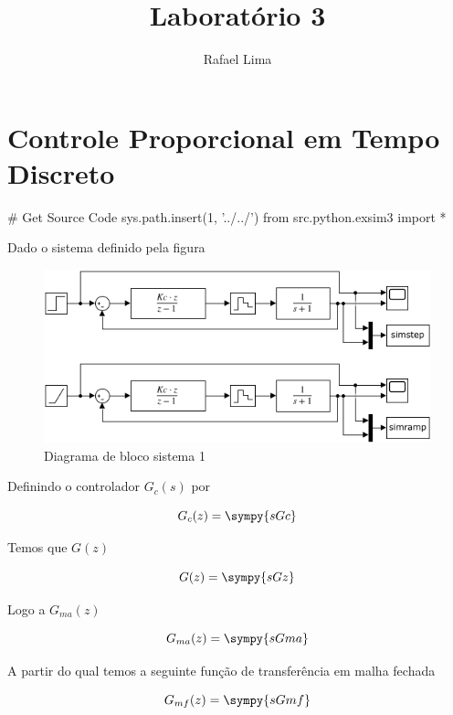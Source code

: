 \documentclass[a4paper,11pt]{article}
\title{Laboratório 3} %
\author{Rafael Lima}
\begin{document}

\section{Controle Proporcional em Tempo Discreto}

\begin{sympycode}
# Get Source Code
sys.path.insert(1, '../../')
from src.python.exsim3 import *
\end{sympycode}

Dado o sistema definido pela figura

\begin{figure}[H]
    \centering
    \includegraphics[width=0.8\linewidth]{img/exsim3modelPart1.png}
    \caption{Diagrama de bloco sistema 1}
\end{figure}

Definindo o controlador $G_c(s)$ por

\begin{equation}
    G_c(z) = \sympy{sGc}
\end{equation}

Temos que $G(z)$

\begin{equation}
    G(z) = \sympy{sGz}
\end{equation}

Logo a $G_{ma}(z)$

\begin{equation}\label{eq:ex3-gma1}
    G_{ma}(z) = \sympy{sGma}
\end{equation}

A partir do qual temos a seguinte função de transferência em malha fechada

\begin{equation}
    G_{mf}(z) = \sympy{sGmf}
\end{equation}
\end{document}
